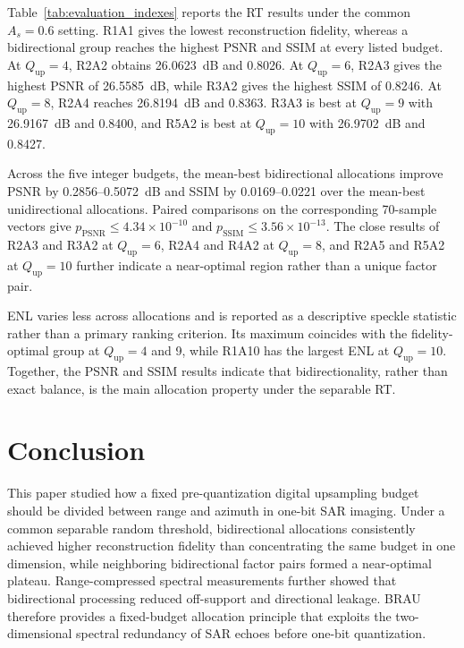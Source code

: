 \documentclass[conference]{IEEEtran}
\begin{document}
Table~\ref{tab:evaluation_indexes} reports the RT results under the common $A_s=0.6$ setting. R1A1 gives the lowest reconstruction fidelity, whereas a bidirectional group reaches the highest PSNR and SSIM at every listed budget. At $Q_{\mathrm{up}}=4$, R2A2 obtains 26.0623~dB and 0.8026. At $Q_{\mathrm{up}}=6$, R2A3 gives the highest PSNR of 26.5585~dB, while R3A2 gives the highest SSIM of 0.8246. At $Q_{\mathrm{up}}=8$, R2A4 reaches 26.8194~dB and 0.8363. R3A3 is best at $Q_{\mathrm{up}}=9$ with 26.9167~dB and 0.8400, and R5A2 is best at $Q_{\mathrm{up}}=10$ with 26.9702~dB and 0.8427.

Across the five integer budgets, the mean-best bidirectional allocations improve PSNR by 0.2856--0.5072~dB and SSIM by 0.0169--0.0221 over the mean-best unidirectional allocations. Paired comparisons on the corresponding 70-sample vectors give $p_{\mathrm{PSNR}}\leq4.34\times10^{-10}$ and $p_{\mathrm{SSIM}}\leq3.56\times10^{-13}$. The close results of R2A3 and R3A2 at $Q_{\mathrm{up}}=6$, R2A4 and R4A2 at $Q_{\mathrm{up}}=8$, and R2A5 and R5A2 at $Q_{\mathrm{up}}=10$ further indicate a near-optimal region rather than a unique factor pair.

ENL varies less across allocations and is reported as a descriptive speckle statistic rather than a primary ranking criterion. Its maximum coincides with the fidelity-optimal group at $Q_{\mathrm{up}}=4$ and 9, while R1A10 has the largest ENL at $Q_{\mathrm{up}}=10$. Together, the PSNR and SSIM results indicate that bidirectionality, rather than exact balance, is the main allocation property under the separable RT.

\section{Conclusion}

This paper studied how a fixed pre-quantization digital upsampling budget should be divided between range and azimuth in one-bit SAR imaging. Under a common separable random threshold, bidirectional allocations consistently achieved higher reconstruction fidelity than concentrating the same budget in one dimension, while neighboring bidirectional factor pairs formed a near-optimal plateau. Range-compressed spectral measurements further showed that bidirectional processing reduced off-support and directional leakage. BRAU therefore provides a fixed-budget allocation principle that exploits the two-dimensional spectral redundancy of SAR echoes before one-bit quantization.
\end{document}
